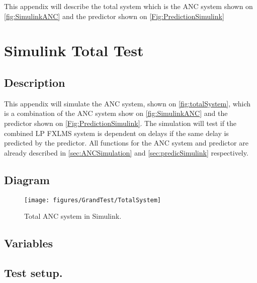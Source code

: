  \label{sec:TotalSystem}
This appendix will describe the total system which is the ANC system shown on \autoref{fig:SimulinkANC} and the predictor shown on \autoref{Fig:PredictionSimulink} 

\section{Simulink Total Test} \label{sec:SimulinkTotalSystem}

\subsection{Description}
This appendix will simulate the ANC system, shown on \autoref{fig:totalSystem}, which is a combination of the ANC system show on \autoref{fig:SimulinkANC} and the predictor shown on \autoref{Fig:PredictionSimulink}. The simulation will test if the combined LP FXLMS system is dependent on delays if the same delay is predicted by the predictor. All functions for the ANC system and predictor are already described in \autoref{sec:ANCSimulation} and \autoref{sec:predicSimulink} respectively. 

\subsection{Diagram}
\begin{figure}[H]
	\centering
	\texttt{[image: figures/GrandTest/TotalSystem]}
	\caption{Total ANC system in Simulink.}
	\label{fig:totalSystem}
\end{figure}


\subsection{Variables}



\subsection{Test setup.}

